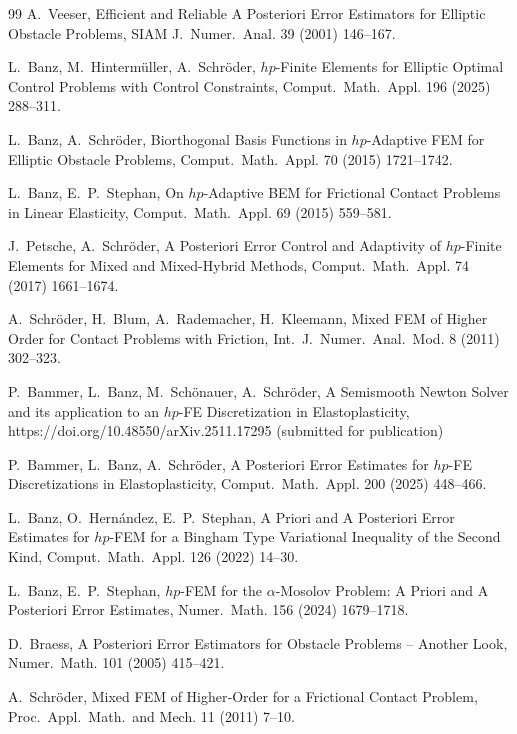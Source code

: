 \documentclass[12pt,twoside,reqno]{amsart}
\theoremstyle{definition}
\numberwithin{equation}{section}
\begin{document}
\begin{thebibliography}{99}
 A.~Veeser, Efficient and Reliable A Posteriori Error Estimators for Elliptic Obstacle Problems, SIAM J.~Numer.~Anal. 39 (2001) 146--167.

 L.~Banz, M.~Hintermüller, A.~Schröder, $hp$-Finite Elements for Elliptic Optimal Control Problems with Control Constraints, Comput.~Math.~Appl. 196 (2025) 288--311.

 L.~Banz, A.~Schröder, Biorthogonal Basis Functions in $hp$-Adaptive FEM for Elliptic Obstacle Problems, Comput.~Math.~Appl. 70 (2015) 1721--1742.

 L.~Banz, E.~P.~Stephan, On $hp$-Adaptive BEM for Frictional Contact Problems in Linear Elasticity, Comput.~Math.~Appl. 69 (2015) 559--581.

 J.~Petsche, A.~Schröder, A Posteriori Error Control and Adaptivity of $hp$-Finite Elements for Mixed and Mixed-Hybrid Methods, Comput.~Math.~Appl. 74 (2017) 1661--1674.


 A.~Schröder, H.~Blum, A.~Rademacher, H.~Kleemann, Mixed FEM of Higher Order for Contact Problems with Friction, Int.~J.~Numer.~Anal.~Mod. 8 (2011) 302--323.


 P.~Bammer, L.~Banz, M.~Schönauer, A.~Schröder, A Semismooth Newton Solver and its application to an $hp$-FE Discretization in Elastoplasticity, https://doi.org/10.48550/arXiv.2511.17295 (submitted for publication)

 P.~Bammer, L.~Banz, A.~Schröder, A Posteriori Error Estimates for $hp$-FE Discretizations in Elastoplasticity, Comput.~Math.~Appl. 200 (2025) 448--466.

 L.~Banz, O.~Hernández, E.~P.~Stephan, A Priori and A Posteriori Error Estimates for $hp$-FEM for a Bingham Type Variational Inequality of the Second Kind, Comput.~Math.~Appl. 126 (2022) 14--30.

 L.~Banz, E.~P.~Stephan, $hp$-FEM for the $\alpha $-Mosolov Problem: A Priori and A Posteriori Error Estimates, Numer.~Math. 156 (2024) 1679--1718.

 D.~Braess, A Posteriori Error Estimators for Obstacle Problems – Another Look, Numer.~Math. 101 (2005) 415--421.

 A.~Schröder, Mixed FEM of Higher‐Order for a Frictional Contact Problem, Proc.~Appl.~Math.~and Mech. 11 (2011) 7--10.


\end{thebibliography}
\end{document}
